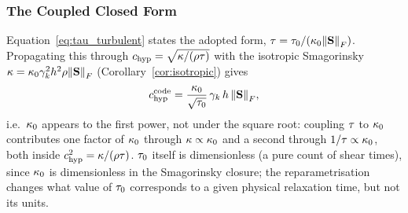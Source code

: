 \subsubsection{The Coupled Closed Form}
Equation~\eqref{eq:tau_turbulent} states the adopted form,
$\tau=\tau_0/(\kappa_{0}\norm{\mathbf{S}}_F)$. Propagating this through
$c_{\rm hyp}=\sqrt{\kappa/(\rho\tau)}$ with the isotropic Smagorinsky
$\kappa=\kappa_{0}\gamma_{k}^2h^2\rho\norm{\mathbf{S}}_F$
(Corollary~\ref{cor:isotropic}) gives
\begin{equation}
  \label{eq:code_turbulent_new}
  c_{\rm hyp}^{\rm code} = \frac{\kappa_{0}}{\sqrt{\tau_0}}\,\gamma_{k}\,h\,\norm{\mathbf{S}}_F ,
\end{equation}
i.e.\ $\kappa_{0}$ appears to the first power, not under the square root:
coupling $\tau$ to $\kappa_{0}$ contributes one factor of $\kappa_{0}$
through $\kappa\propto\kappa_{0}$ and a second through
$1/\tau\propto\kappa_{0}$, both inside $c_{\rm hyp}^2=\kappa/(\rho\tau)$.
$\tau_0$ itself is dimensionless (a pure count of shear times),
since $\kappa_{0}$ is dimensionless in the Smagorinsky closure; the
reparametrisation changes what value of $\tau_0$ corresponds to a
given physical relaxation time, but not its units.

